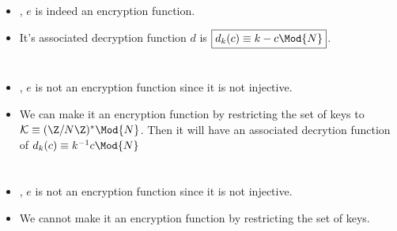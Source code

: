\documentclass[
  coursecode={MTHE 418},
  assignmentname={Homework \homeworknumber},
  studentnumber=20053722,
  name={Bryan Hoang},
  draft,
]{
  ltxanswer%
}
\begin{document}
  \begin{questions}
    \setcounter{question}{\questionnumber}
    \addtocounter{question}{-1}
    \question[10]\
    \begin{parts}
      \part{}
      \begin{solution}
        \begin{itemize}
          \item {}, \(e\) is indeed an encryption function.
          \item It's associated decryption function \(d\) is \(\boxed{d_{k}(c)\equiv k-c \Mod{N}}\).
        \end{itemize}
      \end{solution}

      \part{}
      \begin{solution}
        \begin{itemize}
          \item {}, \(e\) is not an encryption function since it is not injective.
          \item We can make it an encryption function by restricting the set of keys to \(\mathcal{K}\equiv(\Z/N\Z)^{*} \Mod{N}\). Then it will have an associated decrytion function of \(d_{k}(c)\equiv k^{-1}c \Mod{N}\)
        \end{itemize}
      \end{solution}

      \part{}
      \begin{solution}
        \begin{itemize}
          \item {}, \(e\) is not an encryption function since it is not injective.
          \item We cannot make it an encryption function by restricting the set of keys.
        \end{itemize}
      \end{solution}
    \end{parts}
  \end{questions}
\end{document}
